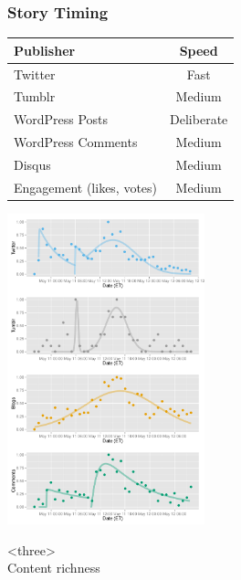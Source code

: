 \documentclass{beamer}
\begin{document}
\begin{frame} \frametitle{Story Timing}
\begin{table}
\begin{tabular}{l|c}
\hline
   {Publisher}   &   {Speed} \\
\hline 
    Twitter      &    Fast  \\ 
    Tumblr      &        Medium \\
    WordPress Posts &   Deliberate   \\
    WordPress Comments & Medium\\
    Disqus       &    Medium\\
    Engagement (likes, votes) &  Medium\\
\hline
\end{tabular}
\end{table}
\end{frame}


\begin{frame}
  \begin{center}
    \includegraphics[height=9.0cm]{./imgs/JPMorgan.pdf}
  \end{center}
\end{frame}


\begin{frame}
\begin{center}
{\Huge <three> \\ [15pt] Content richness }
\end{center}
\end{frame}
\end{document}
